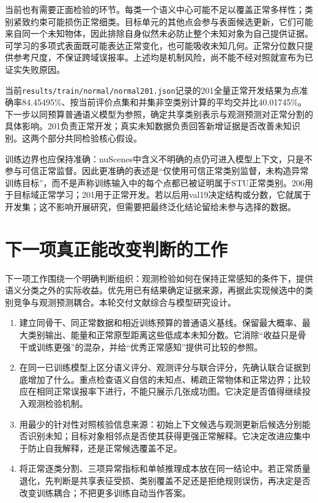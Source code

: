 \documentclass[11pt,a4paper]{article}
\begin{document}
当前也有需要正面检验的环节。每类一个语义中心可能不足以覆盖正常多样性；类别紧致约束可能损伤正常细类。目标单元的其他点会参与表面候选更新，它们可能来自同一个未知物体，因此排除自身似然未必防止整个未知对象为自己提供证据。可学习的多项式表面既可能表达正常变化，也可能吸收未知几何。正常分位数只提供参考尺度，不保证跨域误报率。上述均是机制风险，尚不能不经对照就宣布为已证实失败原因。

当前\texttt{results/train/normal/normal201.json}记录的201全量正常开发结果为点准确率84.45495\%、按当前评价点集和并集非空类别计算的平均交并比40.01745\%。下一步以同预算普通语义模型为参照，确定共享类别表示与观测预测对正常分割的具体影响。201负责正常开发；真实未知数据负责回答新增证据是否改善未知识别。这两个部分共同检验核心假设。

训练边界也应保持准确：nuScenes中含义不明确的点仍可进入模型上下文，只是不参与可信正常监督。因此更准确的表述是“仅使用可信正常类别监督，未构造异常训练目标”，而不是声称训练输入中的每个点都已被证明属于STU正常类别。206用于目标域正常学习；201用于正常开发。若以后用val19决定结构或分数，它就属于开发集；这不影响开展研究，但需要把最终泛化结论留给未参与选择的数据。

\section{下一项真正能改变判断的工作}

下一项工作围绕一个明确判断组织：观测检验如何在保持正常感知的条件下，提供语义分类之外的实际收益。优先用已有结果确定证据来源，再据此实现候选中的类别竞争与观测预测耦合。本轮交付文献综合与模型研究设计。

\begin{enumerate}
\item 建立同骨干、同正常数据和相近训练预算的普通语义基线。保留最大概率、最大类别输出、能量和正常原型距离这些低成本未知分数。它消除“收益只是骨干或训练更强”的混杂，并给“优秀正常感知”提供可比较的参照。
\item 在同一已训练模型上区分语义评分、观测评分与联合评分，先确认联合证据到底增加了什么。重点检查语义自信的未知点、稀疏正常物体和正常边界；比较应在相同正常误报率下进行，不能只展示几张成功图。它决定是否值得继续投入观测检验机制。
\item 用最少的针对性对照核验信息来源：初始上下文候选与观测更新后候选分别能否识别未知；目标对象相邻点是否使其获得更强正常解释。它决定改进应集中于防止自我解释，还是正常候选覆盖不足。
\item 将正常逐类分割、三项异常指标和单帧推理成本放在同一结论中。若正常质量退化，先判断是共享表征受损、类别覆盖不足还是拒绝规则误伤，再决定是否改变训练耦合；不把更多训练自动当作答案。
\end{enumerate}
\end{document}
